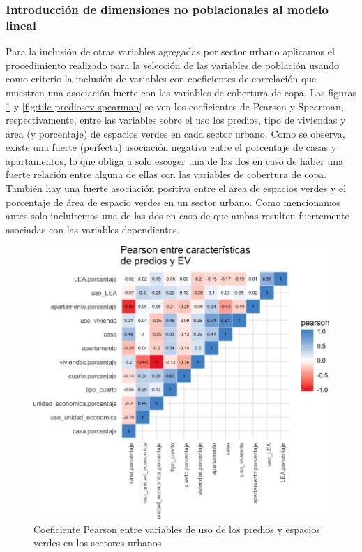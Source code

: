 \documentclass[12pt,]{book}
\begin{document}
\subsubsection{Introducción de dimensiones no poblacionales al modelo
lineal}\label{introduccion-de-dimensiones-no-poblacionales-al-modelo-lineal}

Para la inclusión de otras variables agregadas por sector urbano
aplicamos el procedimiento realizado para la selección de las variables
de población usando como criterio la inclusión de variables con
coeficientes de correlación que muestren una asociación fuerte con las
variables de cobertura de copa. Las figuras
\ref{fig:tile-prediosev-pearson} y \ref{fig:tile-prediosev-spearman} se
ven los coeficientes de Pearson y Spearman, respectivamente, entre las
variables sobre el uso los predios, tipo de viviendas y área (y
porcentaje) de espacios verdes en cada sector urbano. Como se observa,
existe una fuerte (perfecta) asociación negativa entre el porcentaje de
casas y apartamentos, lo que obliga a solo escoger una de las dos en
caso de haber una fuerte relación entre alguna de ellas con las
variables de cobertura de copa. También hay una fuerte asociación
positiva entre el área de espacios verdes y el porcentaje de área de
espacio verdes en un sector urbano. Como mencionamos antes solo
incluiremos una de las dos en caso de que ambas resulten fuertemente
asociadas con las variables dependientes.

\begin{figure}
\includegraphics[width=1\linewidth]{tesis-unigis_files/figure-latex/tile-prediosev-pearson-1} \caption{Coeficiente Pearson entre variables de uso de los predios y espacios verdes en los sectores urbanos}\label{fig:tile-prediosev-pearson}
\end{figure}
\end{document}
